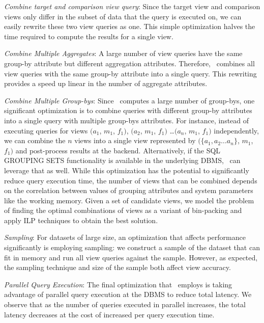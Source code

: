 \begin{denselist}
  \item {\it Combine target and comparison view query}: Since the target view
  and comparison views only differ in the subset of data that the query is
  executed on, we can easily rewrite these two view queries as one.
  This simple optimization halves the time required to compute the results for
  a single view.
  \item {\it Combine Multiple Aggregates}: A large number of view
  queries have the same group-by attribute but different aggregation attributes.
  Therefore, \SeeDB\ combines all view queries with the same group-by attribute
  into a single query. This rewriting provides a speed up linear in the
  number of aggregate attributes.
  \item {\it Combine Multiple Group-bys}: 
  Since \SeeDB\ computes a large number of group-bys, one significant
  optimization is to combine queries with different
  group-by attributes into a single query with multiple group-bys attributes.
  For instance, instead of executing queries for views $(a_1$, $m_1$, $f_1)$,
  $(a_2$, $m_1$, $f_1)$ \ldots $(a_n$, $m_1$, $f_1)$ independently, 
  we can combine the $n$ views into a single view represented by
  $(\{a_1, a_2\ldots a_n\}$, $m_1$, $f_1)$ and post-process results at the
  backend. Alternatively, if the SQL GROUPING SETS functionality is available in
  the underlying DBMS, \SeeDB\ can leverage that as well. 
  While this optimization has the potential to significantly reduce query
  execution time, the number of views that can be combined depends
  on the correlation between values of grouping attributes and system parameters like the
  working memory. Given a set of candidate views, we model the
  problem of finding the optimal combinations of views as a variant of bin-packing and apply ILP techniques to obtain the best solution. 
  \item {\it Sampling}: For datasets of large size, an optimization that
  affects performance significantly is employing sampling: we  
  construct a sample of the dataset
  that can fit in memory and run all view queries against the sample. However, as
  expected, the sampling technique and size of the sample both affect
  view accuracy. 
  \item {\it Parallel Query Execution}: The final optimization that
  \SeeDB\ employs is taking advantage of parallel query execution 
  at the DBMS to reduce total latency.
  We observe that as the number of queries executed in parallel
  increases, the total latency decreases at the cost of
  increased per query execution time.
\end{denselist}
